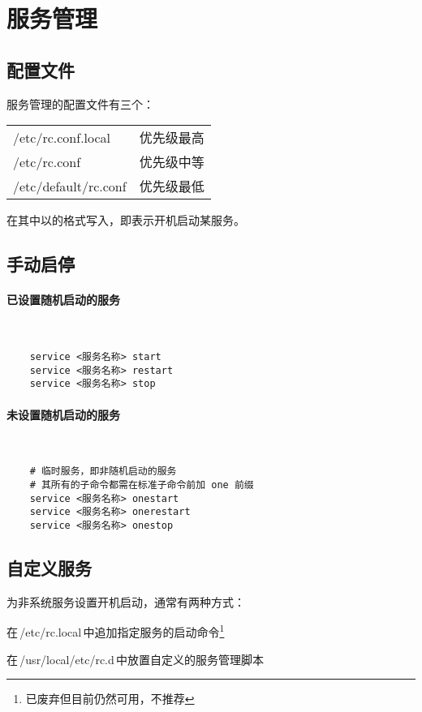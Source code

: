 \section{服务管理}

\subsection{配置文件}
服务管理的配置文件有三个：

\vspace{1ex}
\begin{tabular}{|l|l|}
    \hline
    /etc/rc.conf.local&优先级最高\\
    /etc/rc.conf&优先级中等\\
    /etc/default/rc.conf&优先级最低\\
    \hline
\end{tabular}

\vspace{1ex}
在其中以的格式写入，即表示开机启动某服务。

\subsection{手动启停}

\paragraph{已设置随机启动的服务}~
\begin{lstlisting}
    service <服务名称> start
    service <服务名称> restart
    service <服务名称> stop
\end{lstlisting}

\paragraph{未设置随机启动的服务}~
\begin{lstlisting}
    # 临时服务，即非随机启动的服务
    # 其所有的子命令都需在标准子命令前加 one 前缀
    service <服务名称> onestart
    service <服务名称> onerestart
    service <服务名称> onestop
\end{lstlisting}

\subsection{自定义服务}

为非系统服务设置开机启动，通常有两种方式：
\begin{ITEMIZE}
    \item 在\,/etc/rc.local\,中追加指定服务的启动命令\footnote{已废弃但目前仍然可用，不推荐}
    \item 在\,/usr/local/etc/rc.d\,中放置自定义的服务管理脚本
\end{ITEMIZE}

